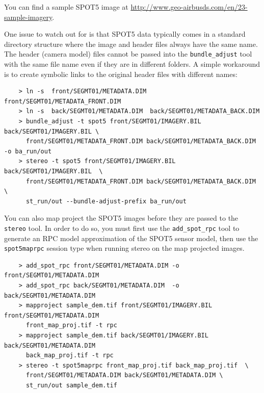 You can find a sample SPOT5 image at 
\url{http://www.geo-airbusds.com/en/23-sample-imagery}.

One issue to watch out for is that SPOT5 data typically comes in a standard
directory structure where the image and header files always have the same name.
The header (camera model) files cannot be passed into the \texttt{bundle\_adjust} tool with the
same file name even if they are in different folders.  A simple workaround is to create
symbolic links to the original header files with different names:

\begin{verbatim}
    > ln -s  front/SEGMT01/METADATA.DIM front/SEGMT01/METADATA_FRONT.DIM
    > ln -s  back/SEGMT01/METADATA.DIM  back/SEGMT01/METADATA_BACK.DIM
    > bundle_adjust -t spot5 front/SEGMT01/IMAGERY.BIL back/SEGMT01/IMAGERY.BIL \
      front/SEGMT01/METADATA_FRONT.DIM back/SEGMT01/METADATA_BACK.DIM -o ba_run/out
    > stereo -t spot5 front/SEGMT01/IMAGERY.BIL back/SEGMT01/IMAGERY.BIL  \ 
      front/SEGMT01/METADATA_FRONT.DIM back/SEGMT01/METADATA_BACK.DIM \ 
      st_run/out --bundle-adjust-prefix ba_run/out
\end{verbatim}

You can also map project the SPOT5 images before they are passed to the 
\texttt{stereo} tool.  In order to do so, you must first use the 
\texttt{add\_spot\_rpc} tool to generate an RPC model approximation of
the SPOT5 sensor model, then use the \texttt{spot5maprpc} session type
when running stereo on the map projected images.

\begin{verbatim}
    > add_spot_rpc front/SEGMT01/METADATA.DIM -o front/SEGMT01/METADATA.DIM
    > add_spot_rpc back/SEGMT01/METADATA.DIM  -o back/SEGMT01/METADATA.DIM
    > mapproject sample_dem.tif front/SEGMT01/IMAGERY.BIL front/SEGMT01/METADATA.DIM 
      front_map_proj.tif -t rpc
    > mapproject sample_dem.tif back/SEGMT01/IMAGERY.BIL back/SEGMT01/METADATA.DIM 
      back_map_proj.tif -t rpc
    > stereo -t spot5maprpc front_map_proj.tif back_map_proj.tif  \ 
      front/SEGMT01/METADATA.DIM back/SEGMT01/METADATA.DIM \ 
      st_run/out sample_dem.tif
\end{verbatim}

